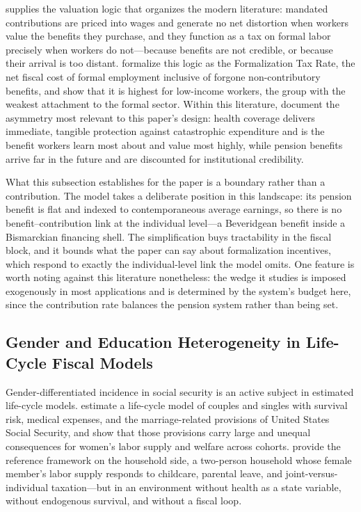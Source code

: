 \documentclass[12pt,a4paper]{article}
\begin{document}
\citet{Summers1989} supplies the valuation logic that organizes the modern
literature: mandated contributions are priced into wages and generate no net
distortion when workers value the benefits they purchase, and they function as a
tax on formal labor precisely when workers do not---because benefits are not
credible, or because their arrival is too distant.
\citet{WorldBankInformalizing2025} formalize this logic as the Formalization Tax
Rate, the net fiscal cost of formal employment inclusive of forgone
non-contributory benefits, and show that it is highest for low-income workers,
the group with the weakest attachment to the formal sector. Within this
literature, \citet{BaezaPackard2006} document the asymmetry most relevant to
this paper's design: health coverage delivers immediate, tangible protection
against catastrophic expenditure and is the benefit workers learn most about and
value most highly, while pension benefits arrive far in the future and are
discounted for institutional credibility.

What this subsection establishes for the paper is a boundary rather than a
contribution. The model takes a deliberate position in this landscape: its
pension benefit is flat and indexed to contemporaneous average earnings, so
there is no benefit--contribution link at the individual level---a Beveridgean
benefit inside a Bismarckian financing shell. The simplification buys
tractability in the fiscal block, and it bounds what the paper can say about
formalization incentives, which respond to exactly the individual-level link the
model omits. One feature is worth noting against this literature nonetheless:
the wedge it studies is imposed exogenously in most applications and is determined
by the system's budget here, since the contribution rate balances the pension system
rather than being set.

\subsection{Gender and Education Heterogeneity in Life-Cycle Fiscal Models}
\label{subsec:lit_gender}

Gender-differentiated incidence in social security is an active subject in
estimated life-cycle models. \citet{BorellaDeNardiYang2023} estimate a
life-cycle model of couples and singles with survival risk, medical expenses,
and the marriage-related provisions of United States Social Security, and show
that those provisions carry large and unequal consequences for women's labor
supply and welfare across cohorts. \citet{FehrKindermann2018} provide the
reference framework on the household side, a two-person household whose female
member's labor supply responds to childcare, parental leave, and joint-versus-individual
taxation---but in an environment without health as a state variable,
without endogenous survival, and without a fiscal loop.
\end{document}
